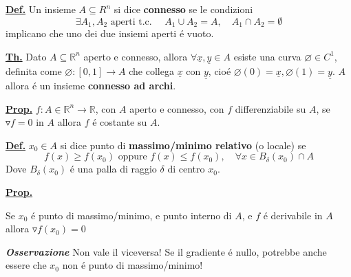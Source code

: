 \documentclass[a4paper,10pt]{article} %
\renewcommand{\b}[1]{%
    {\textbf{#1}}}
\renewcommand{\v}[1]{%
    {\underline{#1}}}
\newcommand{\ldef}[1]{%
    {\smallbreak\par\tiny\textbf{\underline{Def.}} {#1} \smallbreak}}
\newcommand{\lprop}[1]{%
    {\smallbreak\par\tiny\textbf{\underline{Prop.}} {#1} \smallbreak}}
\newcommand{\ltheorem}[1]{%
    {\smallbreak\par\tiny\textbf{\underline{Th.}} {#1} \smallbreak\par}}
\newcommand{\ldim}[1]{%
    {\smallbreak\par\tiny\emph{\textbf{Dimostrazione}} {#1} \par}}
\newcommand{\loss}[1]{%
    {\smallbreak\par\tiny\emph{\textbf{Osservazione}} {#1} \par}}
\renewcommand{\ldim}[1]{{}}
\begin{document}
\begin{multicols}{6}
\ldef{
    Un insieme $ A \subseteq R^n$ si dice \b{connesso} se le condizioni
    \[
        \exists A_1, A_2 \text{ aperti t.c. } \quad A_1 \cup A_2 = A, \quad
        A_1 \cap A_2 = \emptyset 
    \]
    implicano che uno dei due insiemi aperti é vuoto.
}

\ltheorem {
    Dato $A \subseteq \mathbb{R}^n $ aperto e connesso, allora $\forall \v{x},
    \v{y} \in A $ esiste una curva $\varnothing \in C^1$, definita come
    $\varnothing : [0, 1] \rightarrow A$ che collega $\v{x}$ con $\v{y}$, cioé
    $\varnothing (0) = \v{x}, \varnothing (1) = \v{y}$.
    $A$ allora é un insieme
    \b{connesso ad archi}.
}

\lprop {
    $f:A\in\mathbb{R}^n\rightarrow\mathbb{R}$, con $A$ aperto e connesso, con
    $f$ differenziabile su $A$, se $\triangledown f = 0$ in $A$ allora $f$ é
    costante su $A$.
    \ldim{
        Fisso $x, y \in A$. Per il teorema precedente, esiste una curva
        $\varnothing$ che li connette.  Definiamo $g(t) = f(\varnothing (t)),
        \; \; t \in [0, 1]$. \\
        $g$ é derivabile perché composizione di funzioni derivabili. Ora:
        \[
            f(y) - f(x) = g(1) - g(0) = g'(\varepsilon)(1 - 0) =
            g'(\varepsilon)) = \triangledown f(\varnothing(\varepsilon)) 
            \cdot \varnothing'(\varepsilon) = 0
        \]
        E con questo abbiamo dimostrato che $f$ é sempre costante su tutto $A$.
    }
}



\medbreak\dotfill\medbreak



\ldef{
    $x_0 \in A$ si dice punto di \b{massimo/minimo relativo} (o locale) se
    \[
        f(x) \geq f(x_0) \text{ oppure } f(x) \leq f(x_0), \quad 
        \forall x \in B_\delta(x_0) \cap A
    \]
    Dove $B_\delta(x_0)$ é una palla di raggio $\delta$ di centro $x_0$.
}

\lprop{
    Se $x_0$ é punto di massimo/minimo, e punto interno di $A$, e $f$ é
    derivabile in $A$ allora $\triangledown f(x_0) = 0$
    \ldim{
        Definisco
        \[
            g_i(t) = f(x_0 + te_i), \quad \text{ dove } e_i = (0, 0, \dots , 0, 1, 0, \dots)
        \]
        Sappiamo che $g_i$ é derivabile perché lo é anche $f$, e ha
        massimo/minimo in $t = 0$.  Svolgendo:
        \[
            0 = g'(0) = \triangledown f(x_0 + 0 \cdot e_i  ) \cdot e_i = 
            \frac{\delta f}{ \delta x_i} (x_0)
        \]
        E questo vale $\forall i$; cioé, qualunque sia la componente, la
        derivata é nulla, e quindi anche il gradiente é nullo.
    }
    \loss{
        Non vale il viceversa! Se il gradiente é nullo, potrebbe anche essere
        che $x_0$ non é punto di massimo/minimo!
    }
}



\end{multicols}
\end{document}
